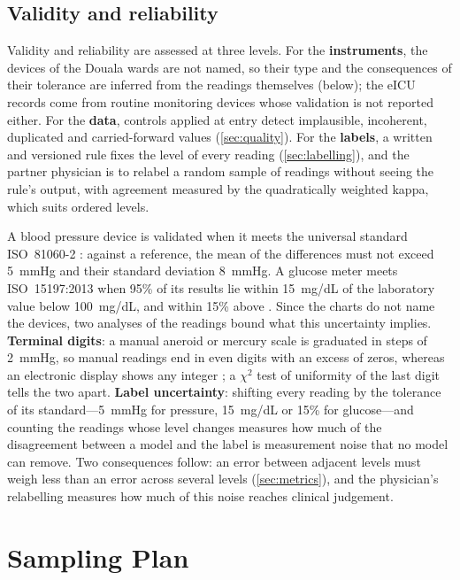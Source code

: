 \documentclass[11pt,a4paper,oneside]{report}
\begin{document}
\subsection{Validity and reliability}\label{sec:validity}\label{sec:instruments-obtained}

Validity and reliability are assessed at three levels. For the \textbf{instruments}, the devices of the Douala wards are not named, so their type and the consequences of their tolerance are inferred from the readings themselves (below); the eICU records come from routine monitoring devices whose validation is not reported either. For the \textbf{data}, controls applied at entry detect implausible, incoherent, duplicated and carried-forward values (\cref{sec:quality}). For the \textbf{labels}, a written and versioned rule fixes the level of every reading (\cref{sec:labelling}), and the partner physician is to relabel a random sample of readings without seeing the rule's output, with agreement measured by the quadratically weighted kappa, which suits ordered levels.

A blood pressure device is validated when it meets the universal standard ISO~81060-2 \parencite{stergiou2018,iso81060-2}: against a reference, the mean of the differences must not exceed 5~mmHg and their standard deviation 8~mmHg. A glucose meter meets ISO~15197:2013 when 95\% of its results lie within 15~mg/dL of the laboratory value below 100~mg/dL, and within 15\% above \parencite{iso15197}. Since the charts do not name the devices, two analyses of the readings bound what this uncertainty implies. \textbf{Terminal digits}: a manual aneroid or mercury scale is graduated in steps of 2~mmHg, so manual readings end in even digits with an excess of zeros, whereas an electronic display shows any integer \parencite{kottke2022}; a $\chi^2$ test of uniformity of the last digit tells the two apart. \textbf{Label uncertainty}: shifting every reading by the tolerance of its standard---5~mmHg for pressure, 15~mg/dL or 15\% for glucose---and counting the readings whose level changes measures how much of the disagreement between a model and the label is measurement noise that no model can remove. Two consequences follow: an error between adjacent levels must weigh less than an error across several levels (\cref{sec:metrics}), and the physician's relabelling measures how much of this noise reaches clinical judgement.

\section{Sampling Plan}\label{sec:sampling}\label{sec:capacity}
\end{document}
